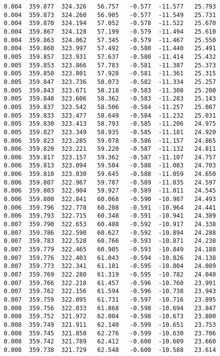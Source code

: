 \begin{verbatim}
   0.004  359.877  324.326   56.757   -0.577  -11.577   25.793
   0.004  359.873  324.260   56.905   -0.577  -11.549   25.731
   0.004  359.870  324.194   57.052   -0.578  -11.522   25.670
   0.004  359.867  324.128   57.199   -0.579  -11.494   25.610
   0.004  359.863  324.062   57.345   -0.579  -11.467   25.550
   0.004  359.860  323.997   57.492   -0.580  -11.440   25.491
   0.005  359.857  323.931   57.637   -0.580  -11.414   25.432
   0.005  359.853  323.866   57.783   -0.581  -11.387   25.373
   0.005  359.850  323.801   57.928   -0.581  -11.361   25.315
   0.005  359.847  323.736   58.073   -0.582  -11.334   25.257
   0.005  359.843  323.671   58.218   -0.583  -11.308   25.200
   0.005  359.840  323.606   58.362   -0.583  -11.283   25.143
   0.005  359.837  323.542   58.506   -0.584  -11.257   25.087
   0.005  359.833  323.477   58.649   -0.584  -11.232   25.031
   0.005  359.830  323.413   58.793   -0.585  -11.206   24.975
   0.005  359.827  323.349   58.935   -0.585  -11.181   24.920
   0.006  359.823  323.285   59.078   -0.586  -11.157   24.865
   0.006  359.820  323.221   59.220   -0.587  -11.132   24.811
   0.006  359.817  323.157   59.362   -0.587  -11.107   24.757
   0.006  359.813  323.094   59.504   -0.588  -11.083   24.703
   0.006  359.810  323.030   59.645   -0.588  -11.059   24.650
   0.006  359.807  322.967   59.787   -0.589  -11.035   24.597
   0.006  359.803  322.904   59.927   -0.589  -11.011   24.545
   0.006  359.800  322.841   60.068   -0.590  -10.987   24.493
   0.006  359.796  322.778   60.208   -0.591  -10.964   24.441
   0.006  359.793  322.715   60.348   -0.591  -10.941   24.389
   0.007  359.790  322.653   60.488   -0.592  -10.917   24.338
   0.007  359.786  322.590   60.627   -0.592  -10.894   24.288
   0.007  359.783  322.528   60.766   -0.593  -10.871   24.238
   0.007  359.779  322.465   60.905   -0.593  -10.849   24.188
   0.007  359.776  322.403   61.043   -0.594  -10.826   24.138
   0.007  359.773  322.341   61.181   -0.595  -10.804   24.089
   0.007  359.769  322.280   61.319   -0.595  -10.782   24.040
   0.007  359.766  322.218   61.457   -0.596  -10.760   23.991
   0.007  359.762  322.156   61.594   -0.596  -10.738   23.943
   0.007  359.759  322.095   61.731   -0.597  -10.716   23.895
   0.008  359.756  322.033   61.868   -0.598  -10.694   23.847
   0.008  359.752  321.972   62.004   -0.598  -10.673   23.800
   0.008  359.749  321.911   62.140   -0.599  -10.651   23.753
   0.008  359.745  321.850   62.276   -0.599  -10.630   23.706
   0.008  359.742  321.789   62.412   -0.600  -10.609   23.660
   0.008  359.738  321.729   62.548   -0.600  -10.588   23.614

\end{verbatim}
